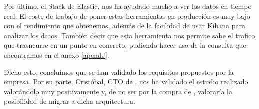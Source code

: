 Por último, el Stack de Elastic, nos ha ayudado mucho a ver los datos en tiempo real. El coste de trabajo de poner estas herramientas en producción es muy bajo con el rendimiento que obtenemos, además de la facilidad de usar Kibana para analizar los datos. También decir que esta herramienta nos permite sabe el trafico que trasncurre en un punto en concreto, pudiendo hacer uso de la consulta que encontramos en el anexo \ref{apendJ}. \par

Dicho esto, concluimos que se han validado los requisitos propuestos
por la empresa. Por su parte, Cristóbal, CTO de \mdata{}, nos ha
validado el estudio realizado valorándolo muy positivamente y, de no
ser por la compra de \vzconnect, valoraría la posibilidad de migrar a
dicha arquitectura.

